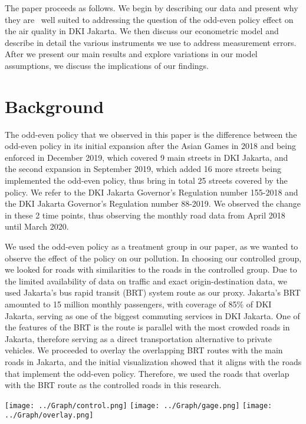 \documentclass[
]{article}
\begin{document}
The paper proceeds as follows. We begin by describing our data and
present why they are ~well suited to addressing the question of the
odd-even policy effect on the air quality in DKI Jakarta. We then
discuss our econometric model and describe in detail the various
instruments we use to address measurement errors. After we present our
main results and explore variations in our model assumptions, we discuss
the implications of our findings.

\hypertarget{background}{%
\section{Background}\label{background}}

The odd-even policy that we observed in this paper is the difference
between the odd-even policy in its initial expansion after the Asian
Games in 2018 and being enforced in December 2019, which covered 9 main
streets in DKI Jakarta, and the second expansion in September 2019,
which added 16 more streets being implemented the odd-even policy, thus
bring in total 25 streets covered by the policy. We refer to the DKI
Jakarta Governor's Regulation number 155-2018 and the DKI Jakarta
Governor's Regulation number 88-2019. We observed the change in these 2
time points, thus observing the monthly road data from April 2018 until
March 2020.

We used the odd-even policy as a treatment group in our paper, as we
wanted to observe the effect of the policy on our pollution. In choosing
our controlled group, we looked for roads with similarities to the roads
in the controlled group. Due to the limited availability of data on
traffic and exact origin-destination data, we used Jakarta's bus rapid
transit (BRT) system route as our proxy. Jakarta's BRT amounted to 15
million monthly passengers, with coverage of 85\% of DKI Jakarta,
serving as one of the biggest commuting services in DKI Jakarta. One of
the features of the BRT is the route is parallel with the most crowded
roads in Jakarta, therefore serving as a direct transportation
alternative to private vehicles. We proceeded to overlay the overlapping
BRT routes with the main roads in Jakarta, and the initial visualization
showed that it aligns with the roads that implement the odd-even policy.
Therefore, we used the roads that overlap with the BRT route as the
controlled roads in this research.

\texttt{[image: ../Graph/control.png]}
\texttt{[image: ../Graph/gage.png]}
\texttt{[image: ../Graph/overlay.png]}
\end{document}
